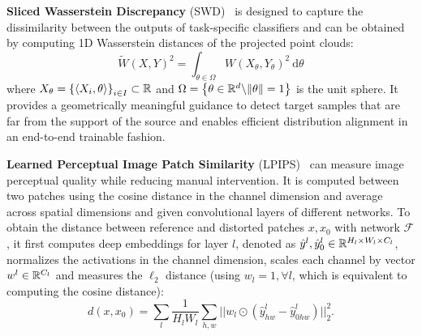 \vspace{1mm}
\noindent\textbf{Sliced Wasserstein Discrepancy} (SWD)~\cite{rabin2011wasserstein} is designed to capture the dissimilarity between the outputs of task-specific classifiers and can be obtained by computing 1D Wasserstein distances of the projected point clouds:
\begin{equation}
\tilde{W}(X, Y)^{2}=\int_{\theta \in \Omega} W\left(X_{\theta}, Y_{\theta}\right)^{2} \mathrm{~d} \theta
\end{equation}
where $X_{\theta}=\left\{\left\langle X_{i}, \theta\right\rangle\right\}_{i \in I} \subset \mathbb{R}$ and $\Omega=\left\{\theta \in \mathbb{R}^{d} \backslash\|\theta\|=1\right\}$ is the unit sphere. 
It provides a geometrically meaningful guidance to detect target samples that are far from the support of the source and enables efficient distribution alignment in an end-to-end trainable fashion.\par

\vspace{1mm}
\noindent\textbf{Learned Perceptual Image Patch Similarity} (LPIPS)~\cite{zhang2018unreasonable} can measure image perceptual quality while reducing manual intervention. 
It is computed between two patches using the cosine distance in the channel dimension and average across spatial dimensions and given convolutional layers of different networks.
To obtain the distance between reference and distorted patches ${x,x_0}$ with network $\mathcal{F}$, it first computes deep embeddings for layer $l$, denoted as $\hat{y}^l, \hat{y}_0^l \in \mathbb{R}^{H_l\times W_l\times C_l}$, normalizes the activations in the channel dimension, scales each channel by vector $w^l \in \mathbb{R}^{C_l}$ and measures the $\ell_2$ distance (using $w_l=1, \forall l$, which is equivalent to computing the cosine distance):
\begin{equation}
d(x,x_0) = \sum_l \dfrac{1}{H_l W_l} \sum_{h,w} || w_l \odot ( \hat{y}_{hw}^l - \hat{y}_{0hw}^l ) ||_2^2.
\label{eqn:dist}
\end{equation}\par

